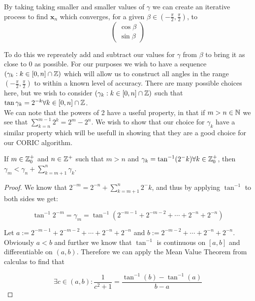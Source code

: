 {By taking taking smaller and smaller values of $\gamma$ we can create an iterative process to find $\mathbf{x}_n$ which converges, for a given $\beta \in (-\frac{\pi}{2}, \frac{\pi}{2})$, to
\begin{displaymath}
	\left( \begin{array}{c}
		\cos{\beta}\\
		\sin{\beta}
	\end{array} \right)
\end{displaymath}

To do this we repreately add and subtract our values for \(\gamma\) from \(\beta\) to bring it as close to 0 as possible. For our purposes we wish to have a sequence \((\gamma_k : k \in [0, n] \cap \mathbb{Z})\) which will allow us to construct all angles in the range \((-\frac{\pi}{2}, \frac{\pi}{2})\) to within a known level of accuracy. There are many possible choices here, but we wish to consider \((\gamma_k : k \in [0, n] \cap \mathbb{Z})\) such that \(\tan \gamma_k = 2^{-k} \forall k \in [0,n] \cap \mathbb{Z}\).\\

We can note that the powers of 2 have a useful property, in that if \(m > n \in \mathbb{N}\) we see that \(\sum_{k=n}^{m-1} 2^k = 2^m - 2^n\). We wish to show that our choice for \(\gamma_k\) have a similar property which will be usefull in showing that they are a good choice for our CORIC algorithm.

\begin{Cordic Gamma Property}
\label{THM_"Cordic Gamma Property"}
If \(m \in \mathbb{Z}^+_0\) and \(n \in \mathbb{Z}^+\) such that \(m > n\) and \(\gamma_k = \tan^{-1}(2^-k) \forall k \in \mathbb{Z}^+_0\), then \(\gamma_m < \gamma_n + \sum_{k=m+1}^n \gamma_k\).
\end{Cordic Gamma Property}
\begin{proof}
We know that \(2^{-m} = 2^{-n} + \sum_{k=m+1}^n 2^-k\), and thus by applying \(\tan^{-1}\) to both sides we get:

\[\tan^{-1} 2^{-m} = \gamma_m = \tan^{-1}(2^{-m-1} + 2^{-m-2} + \cdots + 2^{-n} + 2^{-n})\]

Let \(a := 2^{-m-1} + 2^{-m-2} + \cdots + 2^{-n} + 2^{-n}\) and \(b := 2^{-m-2} + \cdots + 2^{-n} + 2^{-n}\). Obviously \(a < b\) and further we know that \(\tan^{-1}\) is continuous on \([a,b]\) and differentiable on \((a,b)\). Therefore we can apply the Mean Value Theorem from calculas to find that 

\[\exists c \in (a,b) : \frac{1}{c^2 + 1} = \frac{\tan^{-1}(b) - \tan^{-1}(a)}{b-a}\]


\end{proof}}
